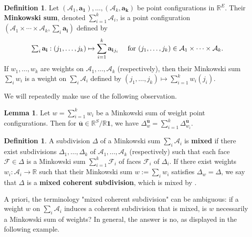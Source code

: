 \documentclass[11pt]{amsart}
\newcommand{\RR}{\mathbb R}
\newcommand{\bu}{{\mathbf u}}
\theoremstyle{definition}
\newtheorem{lem}[thm]{Lemma}
\newtheorem{defn}[thm]{Definition}
\newcommand{\chris}[1]{{\color{cyan} \sf Chris: [#1]}}
\begin{document}
\begin{defn}
\label{def:mink_sum_weights}
Let $(\mathcal A_1, \mathbf {a_1}), \ldots, (\mathcal A_k, \mathbf {a_k})$ be point configurations in $\RR^E$.  Their \textbf{Minkowski sum}, denoted $\sum_{i=1}^k \mathcal A_i$, is a point configuration $(\mathcal A_1 \times \cdots \times \mathcal A_k, \sum_i \mathbf{a_i})$ defined by
\[
\textstyle \sum_i \mathbf{a_i}: \displaystyle (j_1, \ldots, j_k) \mapsto \sum_{i=1}^k \mathbf{a_i}_{j_i} \quad \textnormal{ for } (j_1, \ldots, j_k) \in \mathcal A_1 \times \cdots \times \mathcal A_k.
\]
If $w_1, \ldots, w_k$ are weights on $\mathcal A_1, \ldots, \mathcal A_k$ (respectively), then their Minkowski sum $\sum_{i} w_i$ is a weight on $\sum_i \mathcal A_i$ defined by $(j_1, \ldots, j_k) \mapsto \sum_{i=1}^k w_i(j_i)$.
\end{defn}

We will repeatedly make use of the following observation.

\begin{lem}\label{lem:Minkowskifaces}
Let $w = \sum_{i=1}^k w_i$ be a Minkowski sum of weight point configurations.  Then for $\overline \bu \in \RR^S/\RR\mathbf 1$, we have $\Delta_w^{\overline\bu} = \sum_{i=1}^k \Delta_{w_i}^{\overline\bu}$.
\end{lem}


\begin{defn}
A subdivision $\Delta$ of a Minkowski sum $\sum_i \mathcal A_i$ is \textbf{mixed} if there exist subdivisions $\Delta_1, \ldots, \Delta_k$ of $\mathcal A_1, \ldots, \mathcal A_k$ (respectively) such that each face $\mathcal F \in \Delta$ is a Minkowski sum $\sum_{i=1}^k \mathcal F_i$ of faces $\mathcal F_i$ of $\Delta_i$.  If there exist weights $w_i: \mathcal A_i \to \RR$ such that their Minkowski sum $w := \sum_i w_i$ satisfies $\Delta_w = \Delta$, we say that $\Delta$ is a \textbf{mixed coherent subdivision}, which is mixed by .
\end{defn}

A priori, the terminology "mixed coherent subdivision" can be ambiguous:  if a weight $w$ on $\sum_i \mathcal A_i$ induces a coherent subdivision that is mixed, is $w$ necessarily a Minkowski sum of weights?  In general, the answer is no, as displayed in the following example.
\end{document}
